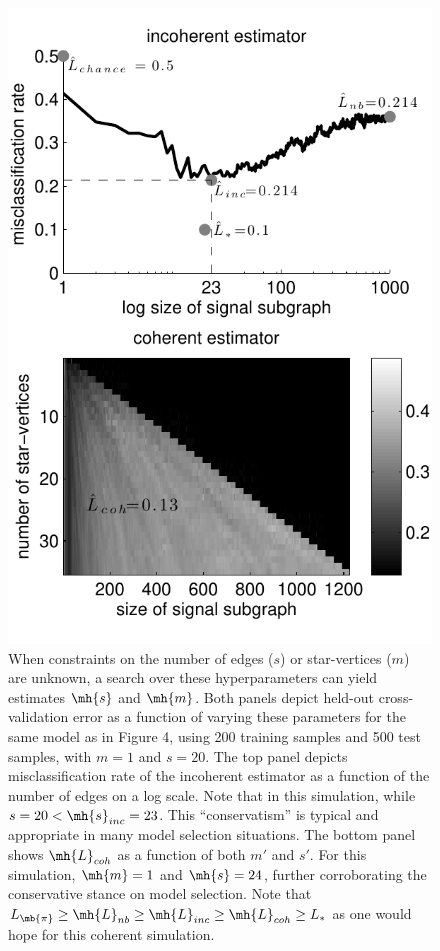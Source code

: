 \documentclass[10pt,journal,cspaper,compsoc]{IEEEtran}
\begin{document}
\begin{figure}[htbp]
	\centering
		\includegraphics[width=0.8\linewidth]{../figs/coherent_image_V70_s20_p10_q30_nTr200_nTe500.pdf}
	\caption{ When constraints on the number of edges ($s$) or star-vertices ($m$) are unknown, a search over these hyperparameters can yield estimates $\mh{s}$ and $\mh{m}$.  Both panels depict held-out cross-validation error as a function of varying these parameters for the same model as in Figure 4, using 200 training samples and 500 test samples, with $m=1$ and $s=20$.  The top panel depicts misclassification rate of the incoherent estimator as a function of the number of edges on a log scale. Note that in this simulation, while $s=20< \mh{s}_{inc}=23$.  This ``conservatism'' is typical and appropriate in many model selection situations.  The bottom panel shows $\mh{L}_{coh}$ as a function of both $m'$ and $s'$.  For this simulation, $\mh{m}=1$ and $\mh{s}=24$, further corroborating the conservative stance on model selection. Note that $L_{\mb{\pi}} \geq \mh{L}_{nb} \geq \mh{L}_{inc} \geq \mh{L}_{coh} \geq L_*$ as one would hope for this coherent simulation.}
	\label{fig:coherent}
\end{figure}
\end{document}
